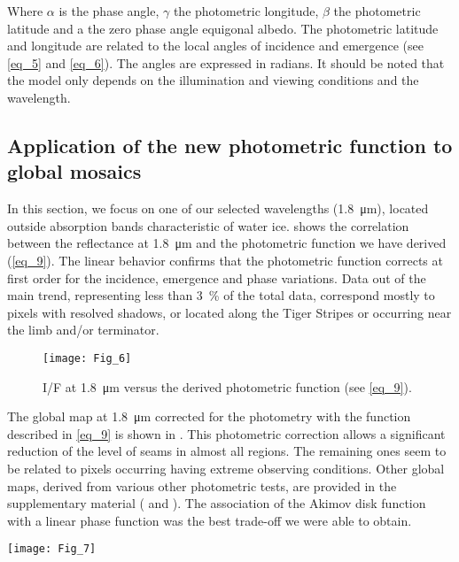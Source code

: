 \documentclass{arxiv-icarus}
\begin{document}
\vfill\null

Where $\alpha$ is the phase angle, $\gamma$ the photometric longitude, $\beta$ the photometric latitude and a the zero phase angle equigonal albedo. The photometric latitude and longitude are related to the local angles of incidence and emergence (see \eqref{eq_5} and \eqref{eq_6}). The angles are expressed in radians. It should be noted that the model only depends on the illumination and viewing conditions and the wavelength.


\subsection{Application of the new photometric function to global mosaics}

In this section, we focus on one of our selected wavelengths (\SI{1.8}{\um}), located outside absorption bands characteristic of water ice.  shows the correlation between the reflectance at \SI{1.8}{\um} and the photometric function we have derived (\eqref{eq_9}). The linear behavior confirms that the photometric function corrects at first order for the incidence, emergence and phase variations. Data out of the main trend, representing less than \SI{3}{\percent} of the total data, correspond mostly to pixels with resolved shadows, or located along the Tiger Stripes or occurring near the limb and/or terminator.

\begin{figure}[!ht]
    \texttt{[image: Fig\_6]}
    \caption{I/F at \SI{1.8}{\um} versus the derived photometric function (see \eqref{eq_9}).}
    \label{fig:fig_6}
\end{figure}

The global map at \SI{1.8}{\um} corrected for the photometry with the function described in \eqref{eq_9} is shown in . This photometric correction allows a significant reduction of the level of seams in almost all regions. The remaining ones seem to be related to pixels occurring having extreme observing conditions. Other global maps, derived from various other photometric tests, are provided in the supplementary material ( and ). The association of the Akimov disk function with a linear phase function was the best trade-off we were able to obtain.

\begin{figure*}[!ht]
    \texttt{[image: Fig\_7]}
    \caption{Equigonal albedo map at \SI{1.8}{\um} normalized to unity at zero phase angle.}
    \label{fig:fig_7}
\end{figure*}
\end{document}
